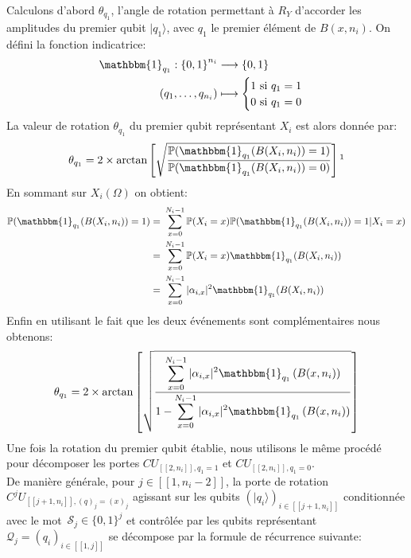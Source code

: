\\
Calculons d'abord $\theta_{q_1}$, l'angle de rotation permettant à $R_Y$ d'accorder les amplitudes du premier qubit $|q_1\rangle$, avec $q_1$ le premier élément de $B(x,n_i)$. On défini la fonction indicatrice:
\begin{align*}
    \mathbbm{1}_{q_1} : {\{0,1\}}^{n_i} &\longrightarrow \{0,1\} \\
    (q_1, \hdots ,q_{n_i}) &\longmapsto
 \begin{cases}
 1 \ \mathrm{si} \ q_1 = 1 \\
 0 \ \mathrm{si} \ q_1 = 0 
 \end{cases}
\end{align*}
La valeur de rotation $\theta_{q_1}$ du premier qubit représentant $X_i$ est alors donnée par:
\begin{align*}
    \theta_{q_1} = 2\times\mathrm{arctan}\left[\sqrt{\frac{\displaystyle \mathbb{P}(\mathbbm{1}_{q_1}(B(X_i,n_i))=1)}{\displaystyle \mathbb{P}(\mathbbm{1}_{q_1}(B(X_i,n_i))=0)}}\right] \footnotemark
\end{align*}
En sommant sur $X_i(\Omega)$ on obtient:
\begin{align*}
    \mathbb{P}(\mathbbm{1}_{q_1}(B(X_i,n_i))=1) =&\ \sum_{x=0}^{N_i-1}\mathbb{P}(X_i=x)\mathbb{P}(\mathbbm{1}_{q_1}(B(X_i,n_i))=1|X_i=x) \\
    =&\ \sum_{x=0}^{N_i-1}\mathbb{P}(X_i=x)\mathbbm{1}_{q_1}(B(X_i,n_i)) \\
    =&\ \sum_{x=0}^{N_i-1}|\alpha_{i,x}|^2\mathbbm{1}_{q_1}(B(X_i,n_i))
\end{align*}
Enfin en utilisant le fait que les deux événements sont complémentaires nous obtenons: 
\begin{align*}
    \theta_{q_1} = 2\times\mathrm{arctan}\left[\sqrt{\frac{\displaystyle \sum_{x=0}^{N_i-1}|\alpha_{i,x}|^2\mathbbm{1}_{q_1}\left(B(x,n_i)\right)}{\displaystyle 1-\sum_{x=0}^{N_i-1}|\alpha_{i,x}|^2\mathbbm{1}_{q_1}\left(B(x,n_i)\right)}}\right]
\end{align*}
Une fois la rotation du premier qubit établie, nous utilisons le  même procédé pour décomposer les portes $CU_{[\![2,n_i]\!],q_1=1}$ et $CU_{[\![2,n_i]\!],q_1=0}$. 
\\
De manière générale, pour $j\in[\![1,n_i-2]\!]$, la porte de rotation $C^jU_{[\![j+1,n_i]\!], (q)_j=(x)_j}$ agissant sur les qubits $(|q_i\rangle)_{i\in[\![j+1,n_i]\!]}$ conditionnée avec le mot\footnotemark \ $\mathcal{S}_j \in \{0,1\}^j$ et contrôlée par les qubits représentant $\mathcal{Q}_j=(q_i)_{i\in[\![1,j]\!]}$ se décompose par la formule de récurrence suivante:
